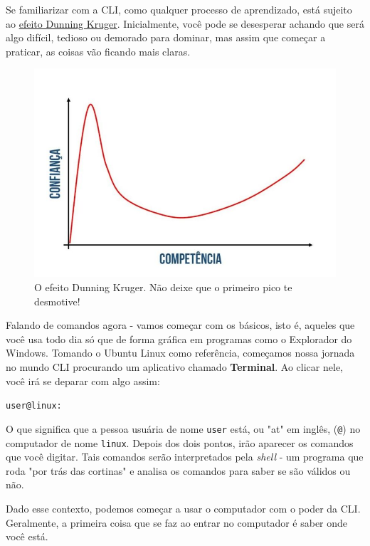 \documentclass{article}
\begin{document}
	Se familiarizar com a CLI, como qualquer processo de aprendizado, está sujeito ao \href{https://jornal.usp.br/radio-usp/o-que-e-o-efeito-dunning-kruger/}{efeito Dunning Kruger}. 
	Inicialmente, você pode se desesperar achando que será algo difícil, tedioso ou demorado para dominar, mas assim que
	começar a praticar, as coisas vão ficando mais claras. 

	\begin{figure}[ht!]
  		\centering
		\includegraphics[scale=0.3]{figs/dk.jpeg} 
  		\caption*{O efeito Dunning Kruger. Não deixe que o primeiro pico te desmotive!}
	\end{figure}

	\newpage
	Falando de comandos agora - vamos começar com os básicos, isto é, aqueles que você usa todo dia só que de forma gráfica
	em programas como o Explorador do Windows. Tomando o Ubuntu Linux como referência, começamos nossa jornada no mundo CLI
	procurando um aplicativo chamado \textbf{Terminal}. Ao clicar nele, você irá se deparar com algo assim: 
	
	\vspace{1ex}
	\texttt{user@linux: ~}
	\vspace{1ex}

	O que significa que a pessoa usuária de nome \texttt{user} está, ou "at" em inglês, (\texttt{@}) no computador de nome
	\texttt{linux}. Depois dos dois pontos, irão aparecer os comandos que você digitar. Tais comandos serão interpretados pela
	\textit{shell} - um programa que roda "por trás das cortinas" e analisa os comandos para saber se são válidos ou não.

	Dado esse contexto, podemos começar a usar o computador com o poder da CLI. Geralmente, a primeira coisa que se faz ao 
	entrar no computador é saber onde você está. 
	
\end{document}
